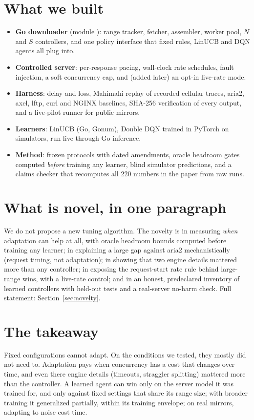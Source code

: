 \section{What we built}
\begin{itemize}
\item \textbf{Go downloader} (module ): range tracker, fetcher, assembler, worker pool, $N$ and $S$ controllers, and one policy interface that fixed rules, LinUCB and DQN agents all plug into.
\item \textbf{Controlled server}: per-response pacing, wall-clock rate schedules, fault injection, a soft concurrency cap, and (added later) an opt-in live-rate mode.
\item \textbf{Harness}:  delay and loss, Mahimahi replay of recorded cellular traces, aria2, axel, lftp, curl and NGINX baselines, SHA-256 verification of every output, and a live-pilot runner for public mirrors.
\item \textbf{Learners}: LinUCB (Go, Gonum), Double DQN trained in PyTorch on simulators, run live through Go inference.
\item \textbf{Method}: frozen protocols with dated amendments, oracle headroom gates computed \emph{before} training any learner, blind simulator predictions, and a claims checker that recomputes all 220 numbers in the paper from raw runs.
\end{itemize}

\section{What is novel, in one paragraph}
We do not propose a new tuning algorithm. The novelty is in measuring \emph{when} adaptation can help at all, with oracle headroom bounds computed before training any learner; in explaining a large gap against aria2 mechanistically (request timing, not adaptation); in showing that two engine details mattered more than any controller; in exposing the request-start rate rule behind large-range wins, with a live-rate control; and in an honest, predeclared inventory of learned controllers with held-out tests and a real-server no-harm check. Full statement: Section~\ref{sec:novelty}.

\section{The takeaway}
\begin{keyidea}
Fixed configurations cannot adapt. On the conditions we tested, they mostly did not need to. Adaptation pays when concurrency has a cost that changes over time, and even there engine details (timeouts, straggler splitting) mattered more than the controller. A learned agent can win only on the server model it was trained for, and only against fixed settings that share its range size; with broader training it generalized partially, within its training envelope; on real mirrors, adapting to noise cost time.
\end{keyidea}

